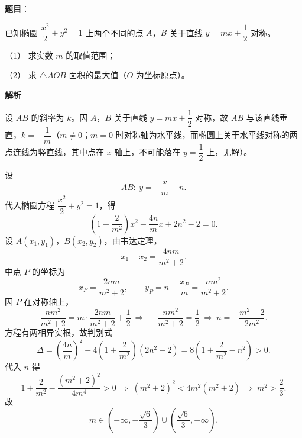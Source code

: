 \begin{answer}

\textbf{题目}：

已知椭圆 \(\dfrac{x^2}{2}+y^2=1\) 上两个不同的点 \(A\)，\(B\) 关于直线 \(y=mx+\dfrac12\) 对称。

（1） 求实数 \(m\) 的取值范围；

（2） 求 \(\triangle AOB\) 面积的最大值（\(O\) 为坐标原点）。
\nopagebreak[4]
\begin{center}\end{center}
\nopagebreak[4]
\textbf{解析}


设 \(AB\) 的斜率为 \(k\)。因 \(A\)，\(B\) 关于直线 \(y=mx+\dfrac12\) 对称，故 \(AB\) 与该直线垂直，\(k=-\dfrac1m\)（\(m\neq0\)；\(m=0\) 时对称轴为水平线，而椭圆上关于水平线对称的两点连线为竖直线，其中点在 \(x\) 轴上，不可能落在 \(y=\dfrac12\) 上，无解）。

设
\nopagebreak[4]
\[
AB:\ y=-\frac{x}{m}+n.
\]
代入椭圆方程 \(\dfrac{x^2}{2}+y^2=1\)，得
\nopagebreak[4]
\[
\left(1+\frac{2}{m^2}\right)x^2-\frac{4n}{m}x+2n^2-2=0.
\]
设 \(A(x_1,y_1)\)，\(B(x_2,y_2)\)，由韦达定理，
\nopagebreak[4]
\[
x_1+x_2=\frac{4nm}{m^2+2}.
\]
中点 \(P\) 的坐标为
\nopagebreak[4]
\[
x_P=\frac{2nm}{m^2+2},\qquad
y_P=n-\frac{x_P}{m}=\frac{nm^2}{m^2+2}.
\]
因 \(P\) 在对称轴上，
\nopagebreak[4]
\[
\frac{nm^2}{m^2+2}=m\cdot\frac{2nm}{m^2+2}+\frac12
\ \Longrightarrow\ -\frac{nm^2}{m^2+2}=\frac12
\ \Longrightarrow\ n=-\frac{m^2+2}{2m^2}.
\]
方程有两相异实根，故判别式
\nopagebreak[4]
\[
\Delta=\left(\frac{4n}{m}\right)^2-4\left(1+\frac{2}{m^2}\right)(2n^2-2)
=8\left(1+\frac{2}{m^2}-n^2\right)>0.
\]
代入 \(n\) 得
\nopagebreak[4]
\[
1+\frac{2}{m^2}-\frac{(m^2+2)^2}{4m^4}>0
\ \Longrightarrow\ (m^2+2)^2<4m^2(m^2+2)
\ \Longrightarrow\ m^2>\frac23.
\]
故
\nopagebreak[4]
\[
m\in\left(-\infty,-\frac{\sqrt6}{3}\right)\cup\left(\frac{\sqrt6}{3},+\infty\right).
\]



\end{answer}
